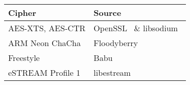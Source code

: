 \begin{table}[t]
    \begin{center}
        \small
        \centering
        \begin{tabular}{l|l}
            \hline
            {\bf Cipher} & {\bf Source} \\
            \hline
            AES-XTS, AES-CTR & OpenSSL~\cite{OpenSSL} \& libsodium~\cite{Sodium}
            \\
            ARM Neon ChaCha & Floodyberry~\cite{Floodyberry} \\
            Freestyle & Babu~\cite{Freestyle} \\
            eSTREAM Profile 1 & libestream~\cite{libestream} \\
        \end{tabular}
    \end{center}

\end{table}

